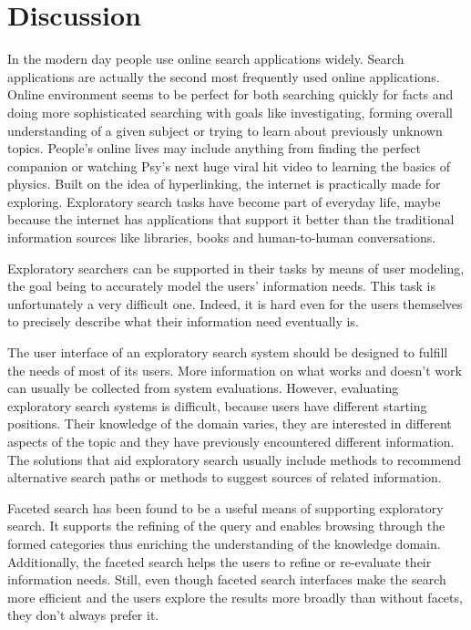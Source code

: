 \section{Discussion}

In the modern day people use online search applications widely. Search applications are actually the second most frequently used online applications. Online environment seems to be perfect for both searching quickly for facts and doing more sophisticated searching with goals like investigating, forming overall understanding of a given subject or trying to learn about previously unknown topics. People's online lives may include anything from finding the perfect companion or watching Psy's next huge viral hit video to learning the basics of physics.  Built on the idea of hyperlinking, the internet is practically made for exploring. Exploratory search tasks have become part of everyday life, maybe because the internet has applications that support it better than the traditional information sources like libraries, books and human-to-human conversations.

Exploratory searchers can be supported in their tasks by means of user modeling, the goal being to accurately model the users' information needs.
This task is unfortunately a very difficult one.
Indeed, it is hard even for the users themselves to precisely describe what their information need eventually is. 

The user interface of an exploratory search system should be designed to fulfill the needs of most of its users. 
More information on what works and doesn't work can usually be collected from system evaluations.
However, evaluating exploratory search systems is difficult, because users have different starting positions.
Their knowledge of the domain varies, they are interested in different aspects of the topic and they have previously encountered different information.
The solutions that aid exploratory search usually include methods to recommend alternative search paths or methods to suggest sources of related information. 

Faceted search has been found to be a useful means of supporting exploratory search. It supports the refining of the query and enables browsing through the formed categories thus enriching the understanding of the knowledge domain. Additionally, the faceted search helps the users to refine or re-evaluate their information needs. Still, even though faceted search interfaces make the search more efficient and the users explore the results more broadly than without facets, they don't always prefer it. 

